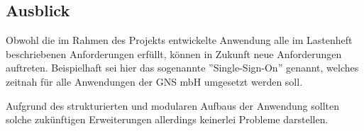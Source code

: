 \documentclass[12pt, xcolor=dvipsnames]{scrartcl}
\begin{document}
\subsection{Ausblick}

Obwohl die im Rahmen des Projekts entwickelte Anwendung alle im Lastenheft beschriebenen Anforderungen erfüllt, können in Zukunft neue Anforderungen auftreten.
Beispielhaft sei hier das sogenannte ''Single-Sign-On'' genannt, welches zeitnah für alle Anwendungen der GNS mbH umgesetzt werden soll.

Aufgrund des strukturierten und modularen Aufbaus der Anwendung sollten solche zukünftigen Erweiterungen allerdings keinerlei Probleme darstellen.

\newpage


\end{document}
